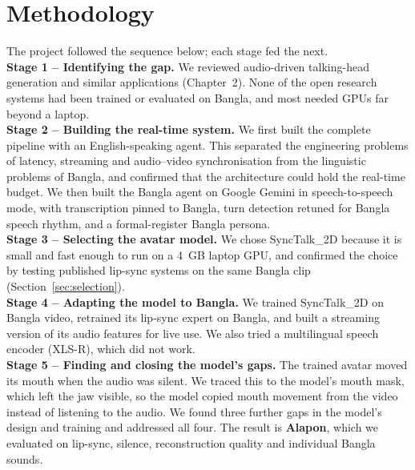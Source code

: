 \section{Methodology}

The project followed the sequence below; each stage fed the next.\\

\noindent
\textbf{Stage 1 -- Identifying the gap.} We reviewed audio-driven talking-head generation and similar applications (Chapter~2). None of the open research systems had been trained or evaluated on Bangla, and most needed GPUs far beyond a laptop.\\

\noindent
\textbf{Stage 2 -- Building the real-time system.} We first built the complete pipeline with an English-speaking agent. This separated the engineering problems of latency, streaming and audio--video synchronisation from the linguistic problems of Bangla, and confirmed that the architecture could hold the real-time budget. We then built the Bangla agent on Google Gemini in speech-to-speech mode, with transcription pinned to Bangla, turn detection retuned for Bangla speech rhythm, and a formal-register Bangla persona.\\

\noindent
\textbf{Stage 3 -- Selecting the avatar model.} We chose SyncTalk\_2D because it is small and fast enough to run on a 4~GB laptop GPU, and confirmed the choice by testing published lip-sync systems on the same Bangla clip (Section~\ref{sec:selection}).\\

\noindent
\textbf{Stage 4 -- Adapting the model to Bangla.} We trained SyncTalk\_2D on Bangla video, retrained its lip-sync expert on Bangla, and built a streaming version of its audio features for live use. We also tried a multilingual speech encoder (XLS-R), which did not work.\\

\noindent
\textbf{Stage 5 -- Finding and closing the model's gaps.} The trained avatar moved its mouth when the audio was silent. We traced this to the model's mouth mask, which left the jaw visible, so the model copied mouth movement from the video instead of listening to the audio. We found three further gaps in the model's design and training and addressed all four. The result is \textbf{Alapon}, which we evaluated on lip-sync, silence, reconstruction quality and individual Bangla sounds.\\

